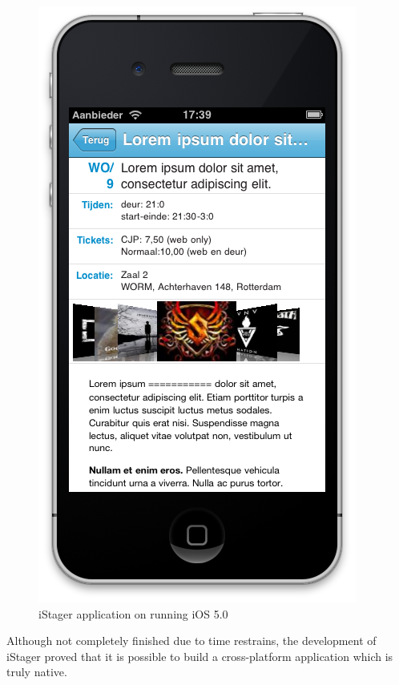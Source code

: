 \begin{figure}
\begin{minipage}{2.2in}
		\includegraphics[scale=0.15]{images/iStager_2.png}
	\end{minipage}%
	\caption{iStager application on running iOS 5.0}%
	\label{fig:1figs}%
\end{figure}



Although not completely finished due to time restrains, the development of iStager proved that it is possible to build a cross-platform application which is truly native.

